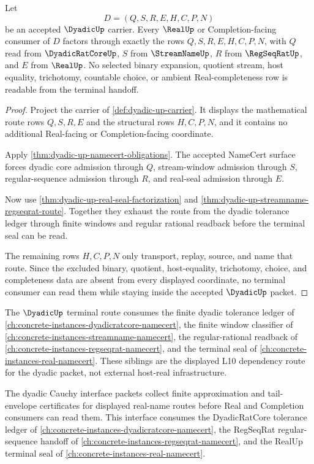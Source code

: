 \begin{theorem}
\label{thm:dyadicup-terminal-real-seal-boundary}
Let
$$
D=(Q,S,R,E,H,C,P,N)
$$
be an accepted $\DyadicUp$ carrier. Every $\RealUp$ or Completion-facing consumer of $D$ factors through exactly the rows $Q,S,R,E,H,C,P,N$, with $Q$ read from $\DyadicRatCoreUp$, $S$ from $\StreamNameUp$, $R$ from $\RegSeqRatUp$, and $E$ from $\RealUp$. No selected binary expansion, quotient stream, host equality, trichotomy, countable choice, or ambient Real-completeness row is readable from the terminal handoff.
\end{theorem}
\begin{proof}
Project the carrier of \autoref{def:dyadic-up-carrier}. It displays the mathematical route rows $Q,S,R,E$ and the structural rows $H,C,P,N$, and it contains no additional Real-facing or Completion-facing coordinate.

Apply \autoref{thm:dyadic-up-namecert-obligations}. The accepted NameCert surface forces dyadic core admission through $Q$, stream-window admission through $S$, regular-sequence admission through $R$, and real-seal admission through $E$.

Now use \autoref{thm:dyadic-up-real-seal-factorization} and \autoref{thm:dyadic-up-streamname-regseqrat-route}. Together they exhaust the route from the dyadic tolerance ledger through finite windows and regular rational readback before the terminal seal can be read.

The remaining rows $H,C,P,N$ only transport, replay, source, and name that route. Since the excluded binary, quotient, host-equality, trichotomy, choice, and completeness data are absent from every displayed coordinate, no terminal consumer can read them while staying inside the accepted $\DyadicUp$ packet.
\end{proof}

The $\DyadicUp$ terminal route consumes the finite dyadic tolerance ledger of \autoref{ch:concrete-instances-dyadicratcore-namecert}, the finite window classifier of \autoref{ch:concrete-instances-streamname-namecert}, the regular-rational readback of \autoref{ch:concrete-instances-regseqrat-namecert}, and the terminal seal of \autoref{ch:concrete-instances-real-namecert}. These siblings are the displayed L10 dependency route for the dyadic packet, not external host-real infrastructure.

The dyadic Cauchy interface packets collect finite approximation and
tail-envelope certificates for displayed real-name routes before Real and
Completion consumers can read them. This interface consumes the DyadicRatCore
tolerance ledger of \autoref{ch:concrete-instances-dyadicratcore-namecert},
the RegSeqRat regular-sequence handoff of
\autoref{ch:concrete-instances-regseqrat-namecert}, and the RealUp terminal
seal of \autoref{ch:concrete-instances-real-namecert}.

